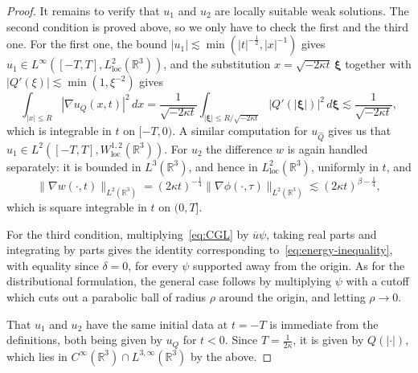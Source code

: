 \documentclass[11pt]{article}
\newcommand{\conj}[1]{\overline{#1}}
\begin{document}
\begin{proof}
  It remains to verify that \(u_{1}\) and \(u_{2}\) are locally
  suitable weak solutions. The second condition is proved above, so we
  only have to check the first and the third one. For the first one,
  the bound \(|u_{1}| \lesssim \min(|t|^{-\frac{1}{2}}, |x|^{-1})\)
  gives
  \(u_{1} \in L^{\infty}([-T, T],
  L_{\text{loc}}^{2}(\mathbb{R}^{3}))\), and the substitution
  \(x = \sqrt{-2\kappa t}\,\bm{\xi}\) together with
  \(|Q'(\xi)| \lesssim \min(1, \xi^{-2})\) gives
  \begin{equation*}
    \int_{|x| \leq R} |\nabla u_{Q}(x, t)|^{2}\,dx
    = \frac{1}{\sqrt{-2\kappa t}}
    \int_{|\bm{\xi}| \leq R / \sqrt{-2\kappa t}} |Q'(|\bm{\xi}|)|^{2}\,d\bm{\xi}
    \lesssim \frac{1}{\sqrt{-2\kappa t}},
  \end{equation*}
  which is integrable in \(t\) on \([-T, 0)\). A similar computation
  for \(u_{\hat{Q}}\) gives us that
  \(u_{1} \in L^{2}([-T, T], W_{\text{loc}}^{1,2}(\mathbb{R}^{3}))\).
  For \(u_{2}\) the difference \(w\) is again handled separately: it
  is bounded in \(L^{3}(\mathbb{R}^{3})\), and hence in
  \(L_{\text{loc}}^{2}(\mathbb{R}^{3})\), uniformly in \(t\), and
  \begin{equation*}
    \|\nabla w(\cdot, t)\|_{L^{2}(\mathbb{R}^{3})}
    = (2\kappa t)^{-\frac{1}{4}}\|\nabla \phi(\cdot, \tau)\|_{L^{2}(\mathbb{R}^{3})}
    \lesssim (2\kappa t)^{\beta - \frac{1}{4}},
  \end{equation*}
  which is square integrable in \(t\) on \((0, T]\).

  For the third condition, multiplying~\eqref{eq:CGL} by
  \(\conj{u}\psi\), taking real parts and integrating by parts gives
  the identity corresponding to~\eqref{eq:energy-inequality}, with
  equality since \(\delta = 0\), for every \(\psi\) supported away
  from the origin. As for the distributional formulation, the general
  case follows by multiplying \(\psi\) with a cutoff which cuts out a
  parabolic ball of radius \(\rho\) around the origin, and letting
  \(\rho \to 0\).

  That \(u_{1}\) and \(u_{2}\) have the same initial data at
  \(t = -T\) is immediate from the definitions, both being given by
  \(u_{Q}\) for \(t < 0\). Since \(T = \frac{1}{2\kappa}\), it is
  given by \(Q(|\cdot|)\), which lies in
  \(C^{\infty}(\mathbb{R}^{3}) \cap L^{3,\infty}(\mathbb{R}^{3})\) by
  the above.


\end{proof}
\end{document}
